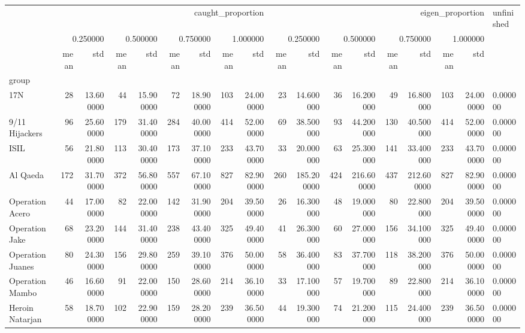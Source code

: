 \begin{tabular}{lrrrrrrrrrrrrrrrrl}
 & \multicolumn{8}{r}{caught_proportion} & \multicolumn{8}{r}{eigen_proportion} & unfinished \\
 & \multicolumn{2}{r}{0.250000} & \multicolumn{2}{r}{0.500000} & \multicolumn{2}{r}{0.750000} & \multicolumn{2}{r}{1.000000} & \multicolumn{2}{r}{0.250000} & \multicolumn{2}{r}{0.500000} & \multicolumn{2}{r}{0.750000} & \multicolumn{2}{r}{1.000000} &  \\
 & mean & std & mean & std & mean & std & mean & std & mean & std & mean & std & mean & std & mean & std &  \\
group &  &  &  &  &  &  &  &  &  &  &  &  &  &  &  &  &  \\
17N & 28 & 13.600000 & 44 & 15.900000 & 72 & 18.900000 & 103 & 24.000000 & 23 & 14.600000 & 36 & 16.200000 & 49 & 16.800000 & 103 & 24.000000 & 0.000000 \\
9/11 Hijackers & 96 & 25.600000 & 179 & 31.400000 & 284 & 40.000000 & 414 & 52.000000 & 69 & 38.500000 & 93 & 44.200000 & 130 & 40.500000 & 414 & 52.000000 & 0.000000 \\
ISIL & 56 & 21.800000 & 113 & 30.400000 & 173 & 37.100000 & 233 & 43.700000 & 33 & 20.000000 & 63 & 25.300000 & 141 & 33.400000 & 233 & 43.700000 & 0.000000 \\
Al Qaeda & 172 & 31.700000 & 372 & 56.800000 & 557 & 67.100000 & 827 & 82.900000 & 260 & 185.200000 & 424 & 216.600000 & 437 & 212.600000 & 827 & 82.900000 & 0.000000 \\
Operation Acero & 44 & 17.000000 & 82 & 22.000000 & 142 & 31.900000 & 204 & 39.500000 & 26 & 16.300000 & 48 & 19.000000 & 80 & 22.800000 & 204 & 39.500000 & 0.000000 \\
Operation Jake & 68 & 23.200000 & 144 & 31.400000 & 238 & 43.400000 & 325 & 49.400000 & 41 & 26.300000 & 60 & 27.000000 & 156 & 34.100000 & 325 & 49.400000 & 0.000000 \\
Operation Juanes & 80 & 24.300000 & 156 & 29.800000 & 259 & 39.100000 & 376 & 50.000000 & 58 & 36.400000 & 83 & 37.700000 & 118 & 38.200000 & 376 & 50.000000 & 0.000000 \\
Operation Mambo & 46 & 16.600000 & 91 & 22.000000 & 150 & 28.600000 & 214 & 36.100000 & 33 & 17.100000 & 57 & 19.700000 & 89 & 22.800000 & 214 & 36.100000 & 0.000000 \\
Heroin Natarjan & 58 & 18.700000 & 102 & 22.900000 & 159 & 28.200000 & 239 & 36.500000 & 44 & 19.300000 & 74 & 21.200000 & 115 & 24.400000 & 239 & 36.500000 & 0.000000 \\

\end{tabular}
